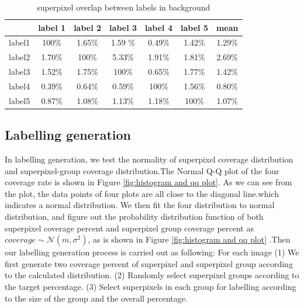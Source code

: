 \documentclass[runningheads,a4paper]{llncs}
\begin{document}
\begin{table}[!tb]
\centering
\begin{tabular}{|c|c|c|c|c|c|c|}
\hline
 & label 1 & label 2&label 3&label 4&label 5&mean\\
\hline
label1& 100\% & 1.65\% & 1.59	\%& 0.49\%& 1.42\%& 1.29\%\\
\hline
label2& 1.70\% & 100\% & 5.33\%& 1.91\%& 1.81\%& 2.69\% \\
\hline
label3& 1.52\% & 1.75\% & 100\%& 0.65\%& 1.77\%& 1.42\% \\
\hline
label4& 0.39\% & 0.64\% & 0.59\%& 100\%& 1.56\%& 0.80\%\\
\hline
label5& 0.87\% & 1.08\% & 1.13\%& 1.18\%& 100\%& 1.07\% \\
\hline
\end{tabular}
\captionsetup{justification=centerlast}
\caption{superpixel overlap between labels in background}
\label{ta: sp overlap b}
\end{table}


\subsection{Labelling generation}
In labelling generation, we test the normality of superpixel coverage distribution and superpixel-group coverage distribution.The Normal Q-Q plot of the four coverage rate is shown in Figure \ref{fig:histogram and qq plot}. As we can see from the plot, the data points of four plots are all close to the diagonal line.which indicates a normal distribution. We then fit the four distribution to normal distribution, and figure out the probability distribution function of both superpixel coverage percent and superpixel group coverage percent as $coverage \sim \mathcal{N} (m,\sigma^2)$, as is shown in Figure \ref{fig:histogram and qq plot} .Then our labelling generation process is carried out as following: For each image (1) We first generate two coverage percent of superpixel and superpixel group according to the calculated  distribution. (2) Randomly select superpixel groups according to the target percentage. (3) Select superpixels in each group for labelling according to the size of the group and the overall percentage.
\end{document}

